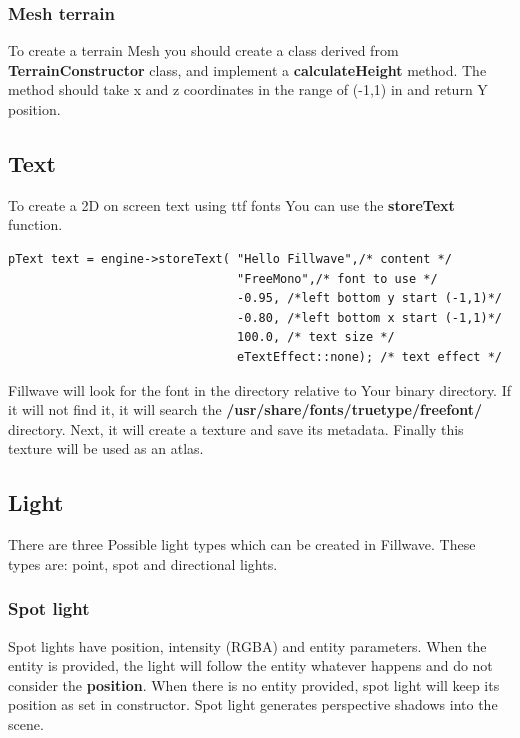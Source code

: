 \documentclass{article}
\begin{document}
\subsubsection{Mesh terrain}\label{sec:MeshTerrain}
\indent \indent To create a terrain Mesh you should create a class derived from \textbf{TerrainConstructor} class, and implement a \textbf{calculateHeight} method. The method should take x and z coordinates in the range of (-1,1) in and return Y position.

\subsection{Text}\label{sec:Text}
\indent \indent To create a 2D on screen text using ttf fonts You can use the \textbf{storeText} function.

\begin{lstlisting}
pText text = engine->storeText( "Hello Fillwave",/* content */
                                "FreeMono",/* font to use */
                                -0.95, /*left bottom y start (-1,1)*/    
                                -0.80, /*left bottom x start (-1,1)*/     
                                100.0, /* text size */
                                eTextEffect::none); /* text effect */
\end{lstlisting}

\indent \indent Fillwave will look for the font in the directory relative to Your binary directory. If it will not find it, it will search the \textbf{/usr/share/fonts/truetype/freefont/} directory. Next, it will create a texture and save its metadata. Finally this texture will be used as an atlas.

\subsection{Light}\label{sec:Light}
\indent \indent There are three Possible light types which can be created in Fillwave. These types are: point, spot and directional lights.


\subsubsection{Spot light}\label{sec:Spot light}
\indent \indent Spot lights have position, intensity (RGBA) and entity parameters. When the entity is provided, the light will follow the entity whatever happens and do not consider the \textbf{position}. When there is no entity provided, spot light will keep its position as set in constructor. Spot light generates perspective shadows into the scene.
\end{document}
